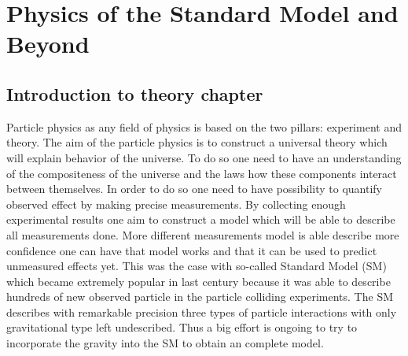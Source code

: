 \chapter{Physics of the Standard Model and Beyond}
\label{chap:Theory}



\section{Introduction to theory chapter}


Particle physics as any field of physics is based on the two pillars: experiment and theory.
The aim of the particle physics is to construct a universal theory which will explain behavior of the universe.
To do so one need to have an understanding of the compositeness of the universe and the laws how these components interact between themselves.
In order to do so one need to have possibility to quantify observed effect by making precise measurements.
By collecting enough experimental results one aim to construct a model which will be able to describe all measurements done.
More different measurements model is able describe more confidence one can have that model works and that it can be used to predict 
unmeasured effects yet. This was the case with so-called Standard Model (SM) which became extremely popular in last century because
it was able to describe hundreds of new observed particle in the particle colliding experiments.
The SM describes with remarkable precision three types of particle interactions with only gravitational type left undescribed.
Thus a big effort is ongoing to try to incorporate the gravity into the SM to obtain an complete model.

